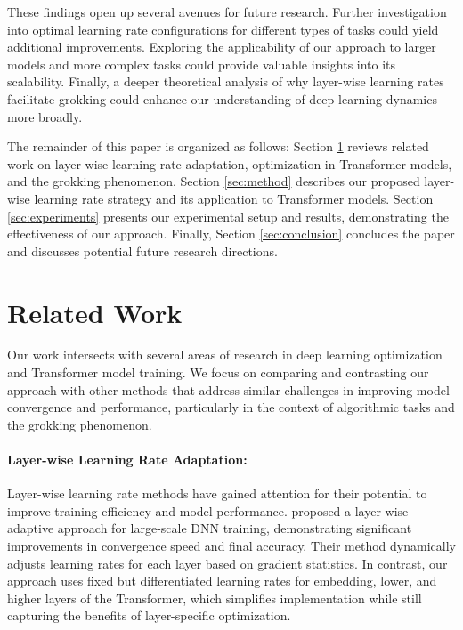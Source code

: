 \documentclass{article} %
\begin{document}
These findings open up several avenues for future research. Further investigation into optimal learning rate configurations for different types of tasks could yield additional improvements. Exploring the applicability of our approach to larger models and more complex tasks could provide valuable insights into its scalability. Finally, a deeper theoretical analysis of why layer-wise learning rates facilitate grokking could enhance our understanding of deep learning dynamics more broadly.

The remainder of this paper is organized as follows: Section \ref{sec:related} reviews related work on layer-wise learning rate adaptation, optimization in Transformer models, and the grokking phenomenon. Section \ref{sec:method} describes our proposed layer-wise learning rate strategy and its application to Transformer models. Section \ref{sec:experiments} presents our experimental setup and results, demonstrating the effectiveness of our approach. Finally, Section \ref{sec:conclusion} concludes the paper and discusses potential future research directions.

\section{Related Work}
\label{sec:related}

Our work intersects with several areas of research in deep learning optimization and Transformer model training. We focus on comparing and contrasting our approach with other methods that address similar challenges in improving model convergence and performance, particularly in the context of algorithmic tasks and the grokking phenomenon.

\paragraph{Layer-wise Learning Rate Adaptation:}
Layer-wise learning rate methods have gained attention for their potential to improve training efficiency and model performance. \citet{Ko2022NotAL} proposed a layer-wise adaptive approach for large-scale DNN training, demonstrating significant improvements in convergence speed and final accuracy. Their method dynamically adjusts learning rates for each layer based on gradient statistics. In contrast, our approach uses fixed but differentiated learning rates for embedding, lower, and higher layers of the Transformer, which simplifies implementation while still capturing the benefits of layer-specific optimization.
\end{document}
